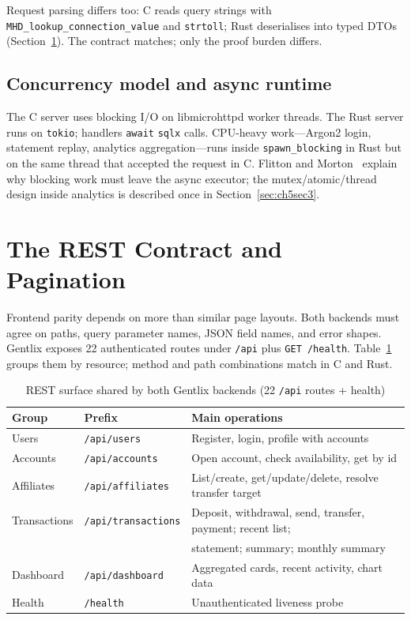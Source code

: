 \par Request parsing differs too: C reads query strings with \texttt{MHD\_lookup\_connection\_value} 
and \texttt{strtoll}; Rust deserialises into typed DTOs (Section~\ref{sec:ch6sec4}). 
The contract matches; only the proof burden differs.

\subsection{Concurrency model and async runtime}
\label{subsec:ch6sec2-4}

\par The C server uses blocking I/O on libmicrohttpd worker threads. The Rust server runs 
on \texttt{tokio}; handlers \texttt{await} \texttt{sqlx} calls. CPU-heavy work---Argon2 
login, statement replay, analytics aggregation---runs inside \texttt{spawn\_blocking} in 
Rust but on the same thread that accepted the request in C. Flitton and Morton~\cite{Flitton2023} 
explain why blocking work must leave the async executor; the mutex/atomic/thread design 
inside analytics is described once in Section~\ref{sec:ch5sec3}.

\section{The REST Contract and Pagination}
\label{sec:ch6sec4}

\par Frontend parity depends on more than similar page layouts. Both backends must agree on paths, query parameter names, JSON field names, and error shapes. Gentlix exposes 22 authenticated routes under \texttt{/api} plus \texttt{GET /health}. Table~\ref{tab:api_routes} groups them by resource; method and path combinations match in C and Rust.

\begin{table}[htbp]
\centering
\small
\begin{tabular}{|l|l|p{6.5cm}|}
\hline
\textbf{Group} & \textbf{Prefix} & \textbf{Main operations} \\
\hline
Users & \texttt{/api/users} &
Register, login, profile with accounts \\
\hline
Accounts & \texttt{/api/accounts} &
Open account, check availability, get by id \\
\hline
Affiliates & \texttt{/api/affiliates} &
List/create, get/update/delete, resolve transfer target \\
\hline
Transactions & \texttt{/api/transactions} &
Deposit, withdrawal, send, transfer, payment; recent list; \\
& & statement; summary; monthly summary \\
\hline
Dashboard & \texttt{/api/dashboard} &
Aggregated cards, recent activity, chart data \\
\hline
Health & \texttt{/health} &
Unauthenticated liveness probe \\
\hline
\end{tabular}
\caption{REST surface shared by both Gentlix backends (22 \texttt{/api} routes + health)}
\label{tab:api_routes}
\end{table}

